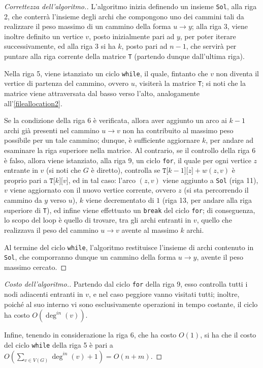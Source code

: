 \documentclass[a4paper, 12pt]{report}
\begin{document}
    \begin{proof}[Correttezza dell'algoritmo.]
        L'algoritmo inizia definendo un insieme \texttt{Sol}, alla riga 2, che conterrà l'insieme degli archi che compongono uno dei cammini tali da realizzare il peso massimo di un cammino della forma $u \rightarrow y$; alla riga 3, viene inoltre definito un vertice $v$, posto inizialmente pari ad $y$, per poter iterare successivamente, ed alla riga 3 si ha $k$, posto pari ad $n - 1$, che servirà per puntare alla riga corrente della matrice \texttt{T} (partendo dunque dall'ultima riga).

        Nella riga 5, viene istanziato un ciclo \texttt{while}, il quale, fintanto che $v$ non diventa il vertice di partenza del cammino, ovvero $u$, visiterà la matrice \texttt{T}; si noti che la matrice viene attraversata dal basso verso l'alto, analogamente all'\cref{fileallocation2}.

        Se la condizione della riga 6 è verificata, allora aver aggiunto un arco ai $k - 1$ archi già presenti nel cammino $u \rightarrow v$ non ha contribuito al massimo peso possibile per un tale cammino; dunque, è sufficiente aggiornare $k$, per andare ad esaminare la riga superiore nella matrice. Al contrario, se il controllo della riga 6 è falso, allora viene istanziato, alla riga 9, un ciclo \texttt{for}, il quale per ogni vertice $z$ entrante in $v$ (si noti che $G$ è diretto), controlla se $\texttt{T[}k - 1\texttt{][}z\texttt{]} + w(z, v)$ è proprio pari a $\texttt{T[}k\texttt{][}v\texttt{]}$, ed in tal caso: l'arco $(z, v)$ viene aggiunto a \texttt{Sol} (riga 11), $v$ viene aggiornato con il nuovo vertice corrente, ovvero $z$ (si sta percorrendo il cammino da $y$ verso $u$), $k$ viene decrementato di $1$ (riga 13, per andare alla riga superiore di \texttt{T}), ed infine viene effettuato un \texttt{break} del ciclo \texttt{for}; di conseguenza, lo scopo del loop è quello di trovare, tra gli archi entranti in $v$, quello che realizzava il peso del cammino $u \rightarrow v$ avente al massimo $k$ archi.

        Al termine del ciclo \texttt{while}, l'algoritmo restituisce l'insieme di archi contenuto in \texttt{Sol}, che comporranno dunque un cammino della forma $u \rightarrow y$, avente il peso massimo cercato.
    \end{proof}

    \begin{proof}[Costo dell'algoritmo.]
        Partendo dal ciclo \texttt{for} della riga 9, esso controlla tutti i nodi adiacenti entranti in $v$, e nel caso peggiore vanno visitati tutti; inoltre, poiché al suo interno vi sono esclusivamente operazioni in tempo costante, il ciclo ha costo $O(\deg^{in}(v))$.

        Infine, tenendo in considerazione la riga 6, che ha costo $O(1)$, si ha che il costo del ciclo \texttt{while} della riga 5 è pari a $\displaystyle O\left(\sum_{v \in V(G)}{\deg^{in}(v) + 1} \right) = O(n + m)$.
    \end{proof}
\end{document}
